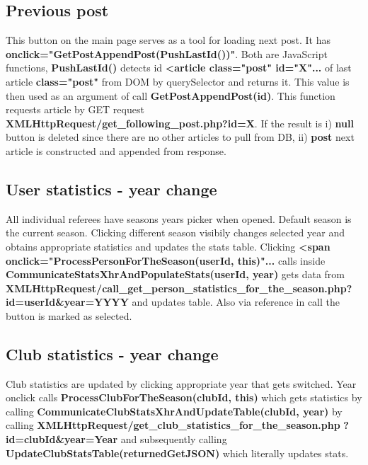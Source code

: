 \subsection{Previous post}
This button on the main page serves as a tool for loading next post. It has \textbf{onclick="GetPostAppendPost(PushLastId())"}. Both are JavaScript functions, \textbf{PushLastId()} detects id \textbf{\textless article class="post" id="X"... } of last article \textbf{class="post"} from DOM by querySelector and returns it. This value is then used as an argument of call \textbf{GetPostAppendPost(id)}. This function requests article by GET request \textbf{XMLHttpRequest/get\_following\_post.php?id=X}.  
If the result is
\newline i)  \textbf{null} button is deleted since there are no other articles to pull from DB,
\newline ii) \textbf{post} next article is constructed and appended from response.

\subsection{User statistics - year change}
All individual referees have seasons years picker when opened. Default season is the current season. Clicking different season visibily changes selected year and obtains appropriate statistics and updates the stats table. Clicking \textbf{\textless span onclick="ProcessPersonForTheSeason(userId, this)"... } calls inside \textbf{CommunicateStatsXhrAndPopulateStats(userId, year)} gets data from \textbf{XMLHttpRequest/call\_get\_person\_statistics\_for\_the\_season.php}\newline \textbf{?id=userId\&year=YYYY} and updates table. Also via  reference in call the button is marked as selected.  

\subsection{Club statistics - year change}
Club statistics are updated by clicking appropriate year that gets switched. Year onclick calls \textbf{ProcessClubForTheSeason(clubId, this)} which gets statistics by calling \textbf{CommunicateClubStatsXhrAndUpdateTable(clubId, year)}
\newline by calling \textbf{XMLHttpRequest/get\_club\_statistics\_for\_the\_season.php}
\newline \textbf{?id=clubId\&year=Year} and subsequently calling
\newline \textbf{UpdateClubStatsTable(returnedGetJSON)} which literally updates stats.

